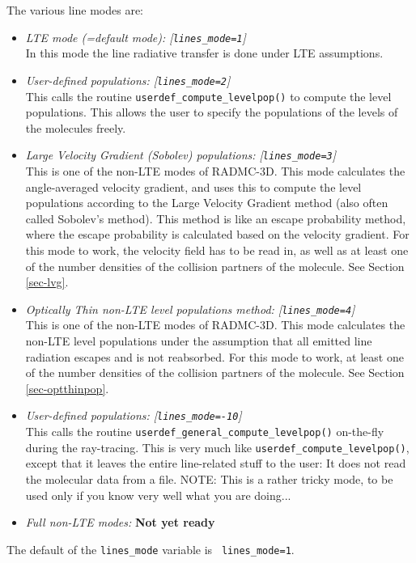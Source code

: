 \documentclass{report}
\begin{document}
The various line modes are:
\begin{itemize}
\item {\em LTE mode (=default mode): [{\small\tt lines\_mode=1}]}\\
  In this mode the line radiative transfer is done under LTE assumptions.
\item {\em User-defined populations: [{\small\tt lines\_mode=2}]}\\
  This calls the routine {\small\tt userdef\_compute\_levelpop()} to compute
  the level populations. This allows the user to specify the populations of
  the levels of the molecules freely.
\item {\em Large Velocity Gradient (Sobolev) populations: [{\small\tt lines\_mode=3}]}\\
  This is one of the non-LTE modes of RADMC-3D. This mode calculates the
  angle-averaged velocity gradient, and uses this to compute the level
  populations according to the Large Velocity Gradient method (also often
  called Sobolev's method). This method is like an escape probability
  method, where the escape probability is calculated based on the velocity
  gradient. For this mode to work, the velocity field has to be read in, as
  well as at least one of the number densities of the collision partners of
  the molecule. See Section \ref{sec-lvg}.
\item {\em Optically Thin non-LTE level populations method: [{\small\tt lines\_mode=4}]}\\
  This is one of the non-LTE modes of RADMC-3D. This mode calculates the
  non-LTE level populations under the assumption that all emitted line
  radiation escapes and is not reabsorbed. For this mode to work, at least
  one of the number densities of the collision partners of the molecule. See
  Section \ref{sec-optthinpop}.
\item {\em User-defined populations: [{\small\tt lines\_mode=-10}]}\\
  This calls the routine {\small\tt userdef\_general\_compute\_levelpop()}
  on-the-fly during the ray-tracing. This is very much like
  {\small\tt userdef\_compute\_levelpop()}, except that it leaves the
  entire line-related stuff to the user: It does not read the molecular
  data from a file. NOTE: This is a rather tricky mode, to be used only
  if you know very well what you are doing... 
\item {\em Full non-LTE modes:} {\bf Not yet ready}
\end{itemize}
The default of the {\small\tt lines\_mode} variable is {\small\tt
  lines\_mode=1}. 
\end{document}
